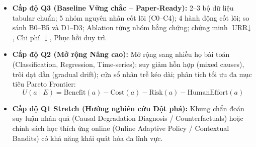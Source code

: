 \begin{itemize}
  \item \textbf{Cấp độ Q3 (Baseline Vững chắc -- Paper-Ready):} 2--3 bộ dữ liệu tabular chuẩn; 5 nhóm nguyên nhân cốt lõi (C0--C4); 4 hành động cốt lõi; so sánh B0--B5 và D1--D3; Ablation từng nhóm bằng chứng; chứng minh $\text{URR} \downarrow$, Chi phí $\downarrow$, Phục hồi duy trì.
  \item \textbf{Cấp độ Q2 (Mở rộng Nâng cao):} Mở rộng sang nhiều họ bài toán (Classification, Regression, Time-series); suy giảm hỗn hợp (mixed causes), trôi dạt dần (gradual drift); cửa sổ nhãn trễ kéo dài; phân tích tối ưu đa mục tiêu Pareto Frontier:
  $$U(a \mid E) = \text{Benefit}(a) - \text{Cost}(a) - \text{Risk}(a) - \text{HumanEffort}(a)$$
  \item \textbf{Cấp độ Q1 Stretch (Hướng nghiên cứu Đột phá):} Khung chẩn đoán suy luận nhân quả (Causal Degradation Diagnosis / Counterfactuals) hoặc chính sách học thích ứng online (Online Adaptive Policy / Contextual Bandits) có khả năng khái quát hóa đa lĩnh vực.
\end{itemize}
